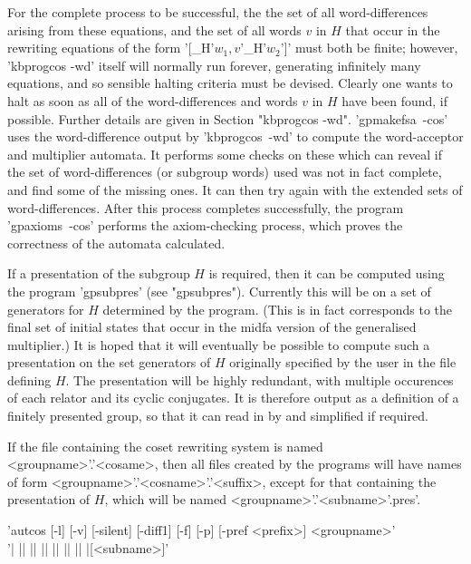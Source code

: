For the complete process to be successful, the
the set of all word-differences arising from these equations,
and the set of all words $v$ in $H$ that occur in the rewriting equations of
the form '[\_H'$w_1,v$'\_H'$w_2$']' must both be finite;
however, 'kbprogcos -wd' itself will normally run forever, generating
infinitely many equations, and so sensible halting criteria must be devised.
Clearly one wants to halt as soon as all of the
word-differences and words $v$ in $H$ have been found, if possible. Further
details are given in Section "kbprogcos -wd". 'gpmakefsa\ -cos' uses the
word-difference output by 'kbprogcos\ -wd' to compute the word-acceptor and
multiplier automata.
It performs some checks on these which can reveal if the set of
word-differences (or subgroup words) used was not in fact complete, and find
some of the missing ones. It can then try again with the extended sets of
word-differences. After this process completes successfully, the program
'gpaxioms\ -cos' performs the axiom-checking process, which proves the
correctness of the automata calculated.

If a presentation of the subgroup $H$ is required, then it can be computed
using the program 'gpsubpres' (see "gpsubpres"). Currently this will be on
a set of generators for $H$ determined by the program. (This is in fact
corresponds to the final set of initial states that occur in the midfa version
of the generalised multiplier.) It is hoped that it
will eventually be possible to compute such a presentation on the set
generators of $H$ originally specified by the user in the file defining $H$.
The presentation will be highly redundant, with multiple occurences of each
relator and its cyclic conjugates. It is therefore output as a {\GAP}
definition of a finitely presented group, so that it can read in by {\GAP}
and simplified if required.

If the file containing the coset rewriting system is named
<groupname>'.'<cosame>, then all files created by the programs will have names
of form <groupname>'.'<cosname>'.'<suffix>, except for that containing the
presentation of $H$, which will be named <groupname>'.'<subname>'.pres'.


'autcos  [-l] [-v] [-silent] [-diff1] [-f] [-p] [-pref <prefix>] <groupname>'\\
'| || || || || || || |[<subname>]'

